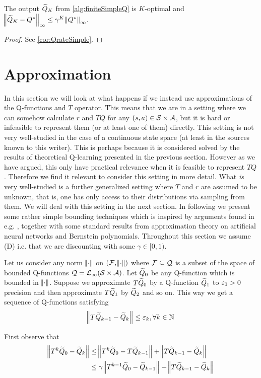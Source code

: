 \begin{prop}
  The output $\widetilde{Q}_K$ from \cref{alg:finiteSimpleQ} is
  $K$-optimal and
  $\norm{\widetilde{Q}_K - Q^*}_\infty \leq \gamma^K \norm{Q^*}_\infty$.
\end{prop}
\begin{proof}
  See \cref{cor:QrateSimple}.
\end{proof}

\section{Approximation}
In this section we will look at what happens if we
instead use approximations of the Q-functions and $T$ operator.
This means that we are in a setting where we can somehow
calculate $r$ and $TQ$ for any $(s,a) \in \mathcal{S} \times \mathcal{A}$,
but it is hard or infeasible to represent them (or at least one of them)
directly.
This setting is not very well-studied in the case of a
continuous state space (at least in the sources known to this writer).
This is perhaps because it is considered solved
by the results of theoretical Q-learning presented in the previous section.
However as we have argued, this only have practical relevance 
when it is feasible to represent $TQ$.
Therefore we find it relevant to consider this setting in more detail.
What \emph{is} very well-studied is a further generalized setting
where $T$ and $r$ are assumed to be unknown,
that is, one has only access to their distributions via sampling from them.
We will deal with this setting in the next section.
In following we present some rather simple bounding techniques
which is inspired by arguments found in e.g. ,
together with some standard results from approximation theory
on artificial neural networks and Bernstein polynomials.
Throughout this section we assume (D)
i.e. that we are discounting with some $\gamma \in [0,1)$.

Let us consider any norm $\norm{\cdot}$ on
$(\mathcal{F}, \norm{\cdot})$ where $\mathcal{F} \subseteq \mathcal{Q}$ is
a subset of the space of bounded
Q-functions $\mathcal{Q} = \mathcal{L}_\infty(\mathcal{S}\times\mathcal{A})$.
Let $\widetilde{Q}_0$ be any Q-function which is bounded in $\norm{\cdot}$.
Suppose we approximate $T\widetilde{Q}_0$ by a Q-function $\widetilde{Q}_1$
to $\varepsilon_1 > 0$ precision and then approximate $T\widetilde{Q}_1$ by $\widetilde{Q}_2$
and so on. This way we get a sequence of Q-functions satisfying
\[ \norm{T\widetilde{Q}_{k-1} - \widetilde{Q}_k} \leq \varepsilon_k, \forall k \in \mathbb{N} \]

First observe that
\begin{align*}
  \norm{T^k \widetilde{Q}_0 - \widetilde{Q}_k}
  &\leq \norm{T^k \widetilde{Q}_0 - T \widetilde{Q}_{k-1}} + \norm{T\widetilde{Q}_{k-1} - \widetilde{Q}_k}
  \\ &\leq \gamma \norm{T^{k-1} \widetilde{Q}_0 - \widetilde{Q}_{k-1}}
  + \norm{T\widetilde{Q}_{k-1} - \widetilde{Q}_k}
\end{align*}

